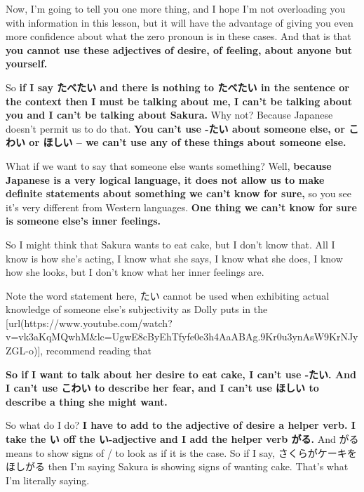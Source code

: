 Now, I'm going to tell you one more thing, and I hope I'm not overloading you with information in this lesson, but it will have the advantage of giving you even more confidence about what the zero pronoun is in these cases. And that is that {\bf you cannot use these adjectives of desire, of feeling, about anyone but yourself.}

{}

So {\bf if I say たべたい and there is nothing to たべたい in the sentence or the context then I must be talking about me, I can't be talking about you and I can't be talking about Sakura.} Why not? Because Japanese doesn't permit us to do that. {\bf You can't use -たい about someone else, or こわい or ほしい -- we can't use any of these things about someone else.}

What if we want to say that someone else wants something? Well, {\bf because Japanese is a very logical language, it does not allow us to make definite statements about something we can't know for sure,} so you see it's very different from Western languages. {\bf One thing we can't know for sure is someone else's inner feelings.}

So I might think that Sakura wants to eat cake, but I don't know that. All I know is how she's acting, I know what she says, I know what she does, I know how she looks, but I don't know what her inner feelings are.

Note the word statement here, たい cannot be used when exhibiting actual knowledge of someone else's subjectivity as Dolly puts in the [url(https://www.youtube.com/watch?v=vk3aKqMQwhM&lc=UgwE8cByEhTfyfe0e3h4AaABAg.9Kr0u3ynAsW9KrNJyZGL-o)], recommend reading that

{\bf So if I want to talk about her desire to eat cake, I can't use -たい. And I can't use こわい to describe her fear, and I can't use ほしい to describe a thing she might want.}

\stopsectionlevel

\startsectionlevel[title={Expressing statements of desire about other people with たがる},reference={expressing-statements-of-desire-about-other-people-with-たがる}]

So what do I do? {\bf I have to add to the adjective of desire a helper verb. I take the い off the い-adjective and I add the helper verb がる.} And がる means to show signs of / to look as if it is the case. So if I say, さくらがケーキをほしがる then I'm saying Sakura is showing signs of wanting cake. That's what I'm literally saying.

